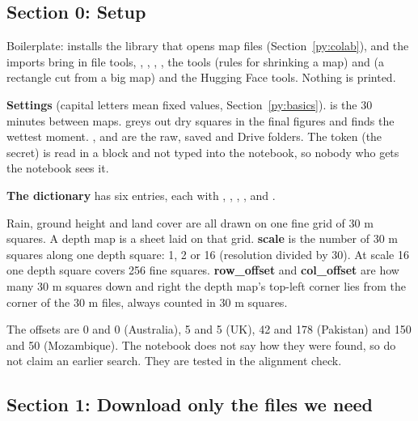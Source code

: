 
\subsection{Section 0: Setup}

Boilerplate:  installs the library that opens  map files (Section~\ref{py:colab}), and the imports bring in file tools, , , , , the  tools  (rules for shrinking a map) and  (a rectangle cut from a big map) and the Hugging Face tools. Nothing is printed.

\textbf{Settings} (capital letters mean fixed values, Section~\ref{py:basics}).  is the 30 minutes between maps.  greys out dry squares in the final figures and  finds the wettest moment. ,  and  are the raw, saved and Drive folders. The token (the  secret) is read in a  block and not typed into the notebook, so nobody who gets the notebook sees it.

\textbf{The  dictionary} has six entries, each with , , , ,  and .

\begin{plainbox}
Rain, ground height and land cover are all drawn on one fine grid of 30 m squares. A depth map is a sheet laid on that grid. \textbf{scale} is the number of 30 m squares along one depth square: 1, 2 or 16 (resolution divided by 30). At scale 16 one depth square covers 256 fine squares. \textbf{row\_offset} and \textbf{col\_offset} are how many 30 m squares down and right the depth map's top-left corner lies from the corner of the 30 m files, always counted in 30 m squares.
\end{plainbox}

The offsets are 0 and 0 (Australia), 5 and 5 (UK), 42 and 178 (Pakistan) and 150 and 50 (Mozambique). The notebook does not say how they were found, so do not claim an earlier search. They are tested in the alignment check.

\subsection{Section 1: Download only the files we need}

